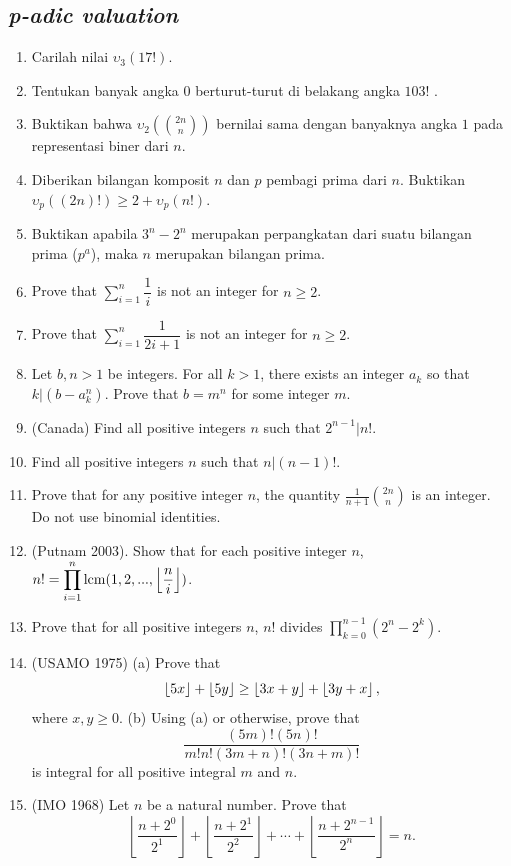 \documentclass[12pt]{scrartcl}
\begin{document}
\subsection{\textit{p-adic valuation}}
\begin{enumerate}
    \item Carilah nilai $\upsilon_3(17!)$.
    \item Tentukan banyak angka 0 berturut-turut di belakang angka $103!$ .
    \item Buktikan bahwa $\upsilon_2(\binom{2n}{n})$ bernilai sama dengan banyaknya angka $1$ pada representasi biner dari $n$.
    \item Diberikan bilangan komposit $n$ dan $p$ pembagi prima dari $n$. Buktikan $\upsilon_p((2n)!) \geq 2+\upsilon_p(n!)$.
    \item Buktikan apabila $3^n-2^n$ merupakan perpangkatan dari suatu bilangan prima ($p^a$), maka $n$ merupakan bilangan prima.
    
    \item Prove that $\displaystyle\sum_{i=1}^{n} \dfrac{1}{i}$ is not an integer for $n \geq 2$.
    
    \item Prove that $\displaystyle\sum_{i=1}^{n} \dfrac{1}{2i+1}$ is not an integer for $n \geq 2$.
    
    \item Let $b, n > 1$ be integers. For all $k > 1$, there exists an integer $a_k$ so that $k | (b-a_k^n)$. Prove that $b = m^n$ for some integer $m$.
    
    \item (Canada) Find all positive integers $n$ such that $2^{n-1}|n!$.
    
    \item Find all positive integers $n$ such that $n | (n-1)!$.
    
    \item Prove that for any positive integer $n$, the quantity $\frac{1}{n+1}\binom{2n}{n}$ is an integer. Do not use binomial identities.
    
    \item (Putnam 2003). Show that for each positive integer $n$, $n! = \displaystyle\prod_{i=1}^n \operatorname{lcm}(1,2,...,\left\lfloor \frac{n}{i} \right\rfloor)$.
    
    \item Prove that for all positive integers $n$, $n!$ divides $\displaystyle\prod_{k=0}^{n-1} (2^n-2^k)$.
    
    \item (USAMO 1975) (a) Prove that \[ \left\lfloor 5x \right\rfloor+\left\lfloor 5y \right\rfloor \ge \left\lfloor 3x+y \right\rfloor+\left\lfloor 3y+x \right\rfloor,\] where $ x,y \ge 0$.
    (b) Using (a) or otherwise, prove that \[ \frac{(5m)!(5n)!}{m!n!(3m+n)!(3n+m)!}\] is integral for all positive integral $ m$ and $ n$. 

    \item (IMO 1968) Let $n$ be a natural number. Prove that\[ \left\lfloor \frac{n+2^0}{2^1} \right\rfloor + \left\lfloor \frac{n+2^1}{2^2} \right\rfloor +\cdots +\left\lfloor \frac{n+2^{n-1}}{2^n}\right\rfloor =n. \]
\end{enumerate}
\end{document}
